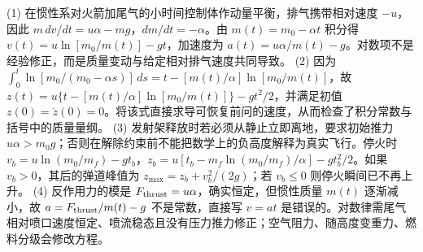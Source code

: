 (1) 在惯性系对火箭加尾气的小时间控制体作动量平衡，排气携带相对速度 \(-u\)，因此 \(m\,dv/dt=u\alpha-mg\)，\(dm/dt=-\alpha\)。由 \(m(t)=m_0-\alpha t\) 积分得 \(v(t)=u\ln[m_0/m(t)]-gt\)，加速度为 \(a(t)=u\alpha/m(t)-g\)。对数项不是经验修正，而是质量变动与给定相对排气速度共同导致。
(2) 因为 \(\int_0^t\ln[m_0/(m_0-\alpha s)]\,ds=t-[m(t)/\alpha]\ln[m_0/m(t)]\)，故 \(z(t)=u\{t-[m(t)/\alpha]\ln[m_0/m(t)]\}-gt^2/2\)，并满足初值 \(z(0)=\dot z(0)=0\)。将该式直接求导可恢复前问的速度，从而检查了积分常数与括号中的质量量纲。
(3) 发射架释放时若必须从静止立即离地，要求初始推力 \(u\alpha>m_0g\)；否则在解除约束前不能把数学上的负高度解释为真实飞行。停火时 \(v_b=u\ln(m_0/m_f)-gt_b\)，\(z_b=u[t_b-m_f\ln(m_0/m_f)/\alpha]-gt_b^2/2\)。如果 \(v_b>0\)，其后的弹道峰值为 \(z_{\max}=z_b+v_b^2/(2g)\)；若 \(v_b\le0\) 则停火瞬间已不再上升。
(4) 反作用力的模是 \(F_{\rm thrust}=u\alpha\)，确实恒定，但惯性质量 \(m(t)\) 逐渐减小，故 \(a=F_{\rm thrust}/m(t)-g\) 不是常数，直接写 \(v=at\) 是错误的。对数律需尾气相对喷口速度恒定、喷流稳态且没有压力推力修正；空气阻力、随高度变重力、燃料分级会修改方程。

